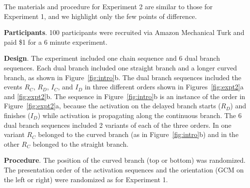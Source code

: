 \documentclass[10pt,letterpaper]{article}
\newcommand{\ev}[2]{$#1_#2$}
\begin{document}
The materials and procedure for Experiment 2 are similar to those for Experiment 1, and we highlight only the few points of difference.

\textbf{Participants}. 100 participants were recruited via Amazon Mechanical Turk and paid \$1 for a 6 minute experiment. 


\textbf{Design}. 
The experiment included one chain sequence and 6 dual branch sequences. Each dual branch included one straight branch and a longer curved branch, as shown in Figure~\ref{fig:intro}b. The dual branch sequences included the events \ev{R}{C}, \ev{R}{D}, \ev{I}{C}, and \ev{I}{D} in three different orders shown in Figures~\ref{fig:expt2}a and \ref{fig:expt2}b. The sequence in Figure~\ref{fig:intro}b is an instance of the order in Figure~\ref{fig:expt2}a, because the activation on the delayed branch starts (\ev{R}{D}) and finishes (\ev{I}{D}) while activation is propagating along the continuous branch. The 6 dual branch sequences included 2 variants of each of the three orders. In one variant \ev{R}{C} belonged to the curved branch (as in Figure~\ref{fig:intro}b) and in the other \ev{R}{C} belonged to the straight branch. 



\textbf{Procedure}. 
The position of the curved branch (top or bottom) was randomized. The presentation order of the activation sequences and the orientation (GCM on the left or right) were randomized as for Experiment 1.
\end{document}
